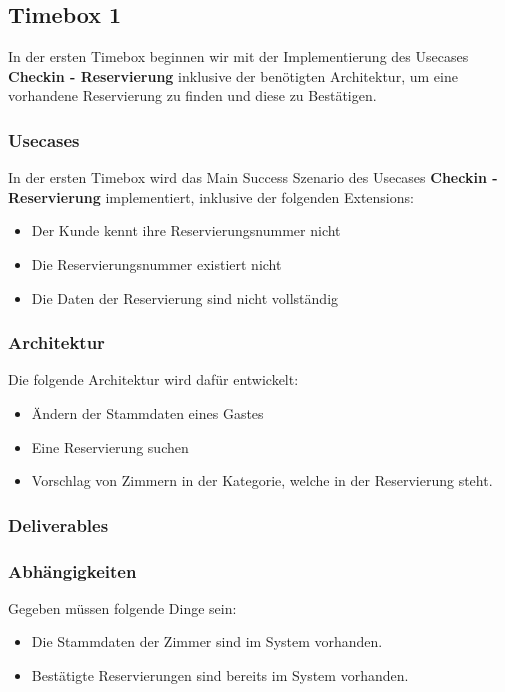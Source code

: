 \subsection{Timebox 1}
In der ersten Timebox beginnen wir mit der Implementierung des Usecases \textbf{Checkin - Reservierung} inklusive der benötigten Architektur,
um eine vorhandene Reservierung zu finden und diese zu Bestätigen.

\subsubsection{Usecases}
In der ersten Timebox wird das Main Success Szenario des Usecases \textbf{Checkin - Reservierung} implementiert,
inklusive der folgenden Extensions:

\begin{itemize}
	\item Der \Gls{Kunde} kennt ihre \Gls{Reservierungsnummer} nicht
	\item Die \Gls{Reservierungsnummer} existiert nicht
	\item Die Daten der \Gls{Reservierung} sind nicht vollständig
\end{itemize}
\subsubsection{Architektur}
Die folgende Architektur wird dafür entwickelt:

\begin{itemize}
	\item Ändern der Stammdaten eines Gastes
	\item Eine Reservierung suchen
	\item Vorschlag von \Gls{Zimmer}n in der Kategorie, welche in der \Gls{Reservierung} steht.
\end{itemize}
\subsubsection{Deliverables}
\subsubsection{Abhängigkeiten}
Gegeben müssen folgende Dinge sein:

\begin{itemize}
	\item Die Stammdaten der Zimmer sind im System vorhanden.
	\item Bestätigte Reservierungen sind bereits im System vorhanden.
\end{itemize}

